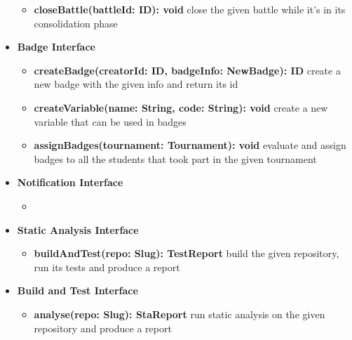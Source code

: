 \begin{itemize}
\begin{itemize}
              \item \textbf{closeBattle(battleId: ID): void }
                    close the given battle while it's in its consolidation phase
          \end{itemize}
    \item \textbf{Badge Interface}
          \begin{itemize}
              \item \textbf{createBadge(creatorId: ID, badgeInfo: NewBadge): ID}
                    create a new badge with the given info and return its id
              \item \textbf{createVariable(name: String, code: String): void}
                    create a new variable that can be used in badges
              \item \textbf{assignBadges(tournament: Tournament): void}
                    evaluate and assign badges to all the students that took part in the given tournament
          \end{itemize}
    \item \textbf{Notification Interface}
          \begin{itemize}
              \item
          \end{itemize}
    \item \textbf{Static Analysis Interface}
          \begin{itemize}
              \item \textbf{buildAndTest(repo: Slug): TestReport}
                    build the given repository, run its tests and produce a report
          \end{itemize}
    \item \textbf{Build and Test Interface}
          \begin{itemize}
              \item \textbf{analyse(repo: Slug): StaReport}
                    run static analysis on the given repository and produce a report
          \end{itemize}
\end{itemize}

